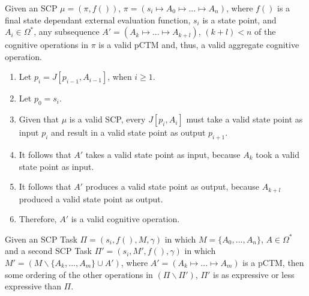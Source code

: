 \begin{lemma}\label{lemma:aggregateValid}
Given an SCP $\mu=(\pi,f())$, $\pi= (s_i \longmapsto A_0 \longmapsto ... \longmapsto A_n)$, where $f()$ is a final state dependant external evaluation function, $s_i$ is a state point, and $A_i \in \Omega^*$, any subsequence $A'=(A_k \longmapsto ... \longmapsto A_{k+l})$, $(k+l)<n$ of the cognitive operations in $\pi$ is a valid pCTM and, thus, a valid aggregate cognitive operation.
\end{lemma}
\begin{bulletProof} \label{proof:aggregateValid}

\begin{enumerate}
\item Let $p_i=J[p_{i-1},A_{i-1}]$, when $i\geq 1$.
\item Let $p_0=s_i$.
\item Given that $\mu$ is a valid SCP, every $J[p_i,A_i]$ must take a valid state point as input $p_i$ and result in a valid state point as output $p_{i+1}$.
\item It follows that $A'$ takes a valid state point as input, because $A_k$ took a valid state point as input.
\item It follows that $A'$ produces a valid state point as output, because $A_{k+l}$ produced a valid state point as output.
\item Therefore, $A'$ is a valid cognitive operation.
\end{enumerate}
\end{bulletProof}

\begin{lemma}\label{lemma:aggregateExpressiveness}
Given an SCP Task $\Pi=(s_i,f(), M, \gamma)$ in which $M=\{A_0,...,A_n\}$, $A\in\Omega^*$ and a second SCP Task $\Pi'=(s_i,M',f(),\gamma)$ in which $M'= (M \smallsetminus \{A_k,...,A_m\} \cup A')$, where $A'=(A_k \longmapsto... \longmapsto A_m)$ is a pCTM, then some ordering of the other operations in $(\Pi \smallsetminus \Pi')$, $\Pi'$ is as expressive or less expressive than $\Pi$.
\end{lemma}

